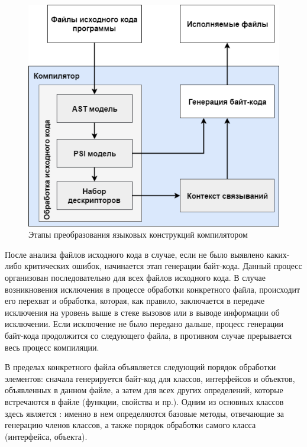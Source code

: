 \begin{figure}[htbp]
    \centering
    \includegraphics[width=\textwidth]{resources/06/04_compiler_flow_diagram.png}
    \caption{Этапы преобразования языковых конструкций компилятором}
    \label{fig05:binding-trace-scheme}
\end{figure}

После анализа файлов исходного кода в случае, если не было выявлено каких-либо критических ошибок, начинается этап генерации байт-кода. Данный процесс организован последовательно для всех файлов исходного кода. В случае возникновения исключения в процессе обработки конкретного файла, происходит его перехват и обработка, которая, как правило, заключается в передаче исключения на уровень выше в стеке вызовов или в выводе информации об исключении. Если исключение не было передано дальше, процесс генерации байт-кода продолжится со следующего файла, в противном случае прерывается весь процесс компиляции.  

В пределах конкретного файла объявляется следующий порядок обработки элементов: сначала генерируется байт-код для классов, интерфейсов и объектов, объявленных в данном файле, а затем для всех других определений, которые встречаются в файле (функции, свойства и пр.). Одним из основных классов здесь является : именно в нем определяются базовые методы, отвечающие за генерацию членов классов, а также порядок обработки самого класса (интерфейса, объекта). 

